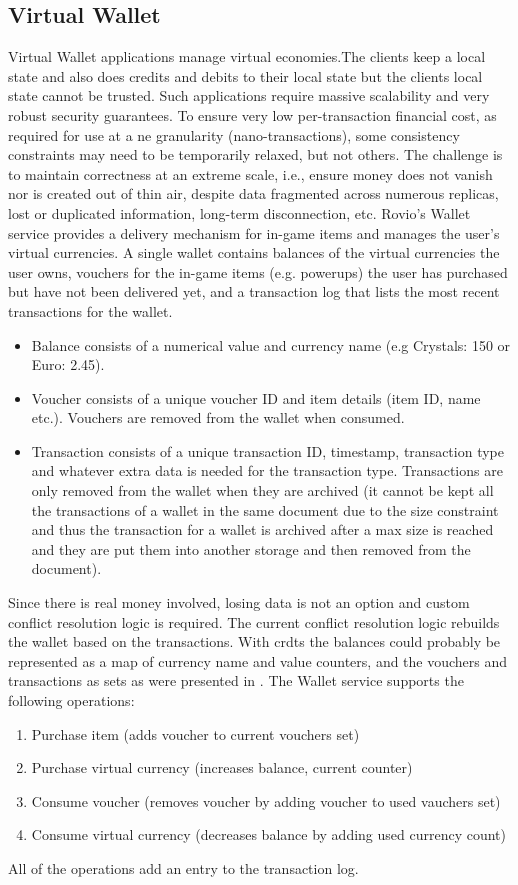 \subsection{Virtual Wallet}
Virtual Wallet applications manage virtual economies.The clients keep a local state and also does credits and debits to their local state but the clients local state cannot be trusted. Such applications require massive scalability and very robust security guarantees. To ensure very low per-transaction financial cost, as required for use at a ne granularity (nano-transactions), some consistency constraints may need to be temporarily relaxed, but not others. The challenge is to maintain correctness at an extreme scale, i.e., ensure money does not vanish nor is created out of thin air, despite data fragmented across numerous replicas, lost or duplicated information, long-term disconnection, etc. Rovio's Wallet service provides a delivery mechanism for in-game items and manages the user's virtual currencies. A single wallet contains balances of the virtual currencies the user owns, vouchers for the in-game items (e.g. powerups) the user has purchased but have not been delivered yet, and a transaction log that lists the most recent transactions for the wallet.
\begin{itemize}
	\item Balance consists of a numerical value and currency name (e.g Crystals: 150 or Euro: 2.45). 
	\item Voucher consists of a unique voucher ID and item details (item ID, name etc.). Vouchers are removed from the wallet when consumed. 
	\item Transaction consists of a unique transaction ID, timestamp, transaction type and whatever extra data is needed for the transaction type. Transactions are only removed from the wallet when they are archived (it cannot be	kept all the transactions of a wallet in the same document due to the size constraint and thus the transaction for a wallet is archived after a max size is reached and they are put them into another storage and then removed from the document).
\end{itemize}
Since there is real money involved, losing data is not an option and custom conflict resolution logic is required. The current conflict resolution logic rebuilds the wallet based on the transactions. With \glspl{crdt} the balances could probably be represented as a map of currency name and value counters, and the vouchers and transactions as sets as were presented in \cite{shapiro11conflictfree}. The Wallet service supports the following operations: 
\begin{enumerate}
	\item Purchase item (adds voucher to current vouchers set)
	\item Purchase virtual currency (increases balance, current counter)
	\item Consume voucher (removes voucher by adding voucher to used vauchers set)
	\item Consume virtual currency (decreases balance by adding used currency count)
\end{enumerate}
All of the operations add an entry to the transaction log.


